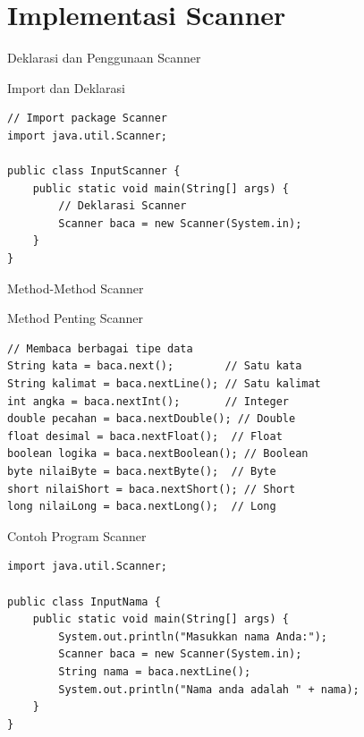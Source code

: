 \documentclass{beamer}
\begin{document}
\section{Implementasi Scanner}
\begin{frame}[fragile]{Deklarasi dan Penggunaan Scanner}
  \begin{block}{Import dan Deklarasi}
    \begin{lstlisting}
// Import package Scanner
import java.util.Scanner;

public class InputScanner {
    public static void main(String[] args) {
        // Deklarasi Scanner
        Scanner baca = new Scanner(System.in);
    }
}
    \end{lstlisting}
  \end{block}
\end{frame}

\begin{frame}[fragile]{Method-Method Scanner}
  \begin{block}{Method Penting Scanner}
    \begin{lstlisting}
// Membaca berbagai tipe data
String kata = baca.next();        // Satu kata
String kalimat = baca.nextLine(); // Satu kalimat
int angka = baca.nextInt();       // Integer
double pecahan = baca.nextDouble(); // Double
float desimal = baca.nextFloat();  // Float
boolean logika = baca.nextBoolean(); // Boolean
byte nilaiByte = baca.nextByte();  // Byte
short nilaiShort = baca.nextShort(); // Short
long nilaiLong = baca.nextLong();  // Long
    \end{lstlisting}
  \end{block}
\end{frame}

\begin{frame}[fragile]{Contoh Program Scanner}
\begin{lstlisting}
import java.util.Scanner;

public class InputNama {
    public static void main(String[] args) {
        System.out.println("Masukkan nama Anda:");
        Scanner baca = new Scanner(System.in);
        String nama = baca.nextLine();
        System.out.println("Nama anda adalah " + nama);
    }
}
\end{lstlisting}
\end{frame}

\end{document}
